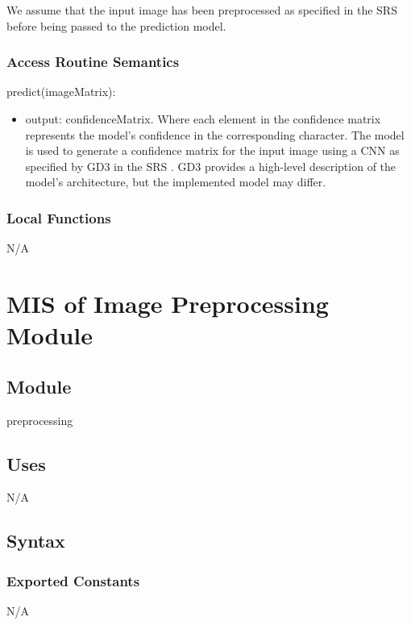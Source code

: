 \documentclass[12pt, titlepage]{article}
\begin{document}
We assume that the input image has been preprocessed as specified in the SRS
before being passed to the prediction model.


\subsubsection{Access Routine Semantics}

\noindent predict(imageMatrix):
\begin{itemize}
\item output: confidenceMatrix. Where each element in the confidence matrix
represents the model's confidence in the corresponding character. The model is
used to generate a confidence matrix for the input image using a CNN as
specified by GD3 in the SRS \citep[4.2.3]{SRS}. GD3 provides a high-level
description of the model's architecture, but the implemented model may differ.
\end{itemize}


\subsubsection{Local Functions}

N/A

\newpage
\section{MIS of Image Preprocessing Module} \label{mPreprocessing}

\subsection{Module}

preprocessing

\subsection{Uses}

N/A

\subsection{Syntax}

\subsubsection{Exported Constants}

N/A
\end{document}
